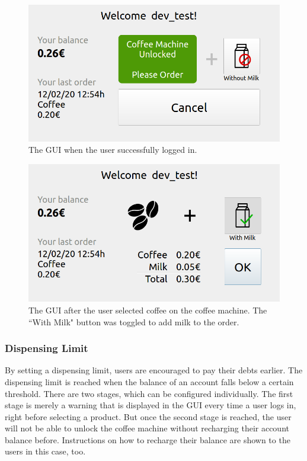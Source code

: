 \documentclass[12pt]{article}
\begin{document}
\begin{figure}[h]
\centering
\includegraphics[width=\textwidth]{./images/gui-new-1.png}
\caption{The GUI when the user successfully logged in.}
\label{fig:gui-new-1}
\end{figure}
\begin{figure}[h]
\includegraphics[width=\textwidth]{./images/gui-new-2.png}
\caption[The GUI after the user selected coffee on the coffee machine.]
{The GUI after the user selected coffee on the coffee machine. The ``With Milk" button was toggled to add milk to the order.}
\label{fig:gui-new-2}
\end{figure}

\subsubsection{Dispensing Limit}
By setting a dispensing limit, users are encouraged to pay their debts earlier.
The dispensing limit is reached when the balance of an account falls below a certain threshold.
There are two stages, which can be configured individually.
The first stage is merely a warning that is displayed in 
the GUI every time a user logs in, right before selecting a product.
But once the second stage is reached,
the user will not be able to unlock the coffee machine without recharging their account balance before.
Instructions on how to recharge their balance are shown to the users in this case, too.
\end{document}

